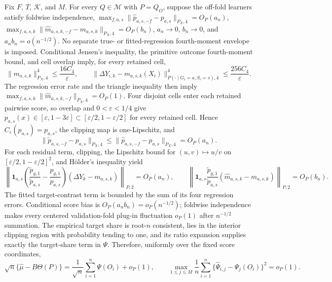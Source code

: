 Fix \(F\), \(T\), \(\mathcal K\), and \(M\). For every \(Q\in\mathcal M\) with \(P=Q_O\), suppose the off-fold learners satisfy foldwise independence, \(\max_{f,a,s}\|\widehat p_{a,s,-f}-p_{a,s}\|_{P_X,4}=O_P(a_n)\), \(\max_{f,a,s,k}\|\widehat m_{a,s,k,-f}-m_{a,s,k}\|_{P_X,4}=O_P(b_n)\), \(a_n\to0\), \(b_n\to0\), and \(a_nb_n=o(n^{-1/2})\). No separate true- or fitted-regression fourth-moment envelope is imposed. Conditional Jensen's inequality, the primitive outcome fourth-moment bound, and cell overlap imply, for every retained cell, \[\|m_{a,s,k}\|_{P_X,4}^4\le \frac{16C_4}{\varepsilon},\qquad \|\Delta Y_{i,k}-m_{a,s,k}(X_i)\|_{P(\cdot\mid G_i=a,S_i=s),4}^4\le\frac{256C_4}{\varepsilon}.\] The regression error rate and the triangle inequality then imply \(\max_{f,a,s,k}\|\widehat m_{a,s,k,-f}\|_{P_X,4}=O_P(1)\). Four disjoint cells enter each retained pairwise score, so overlap and \(0<\varepsilon<1/4\) give \(p_{a,s}(x)\in[\varepsilon,1-3\varepsilon]\subset[\varepsilon/2,1-\varepsilon/2]\) for every retained cell. Hence \(C_\varepsilon(p_{a,s})=p_{a,s}\), the clipping map is one-Lipschitz, and \[\|\widetilde p_{a,s,-f}-p_{a,s}\|_{P_X,4}\le\|\widehat p_{a,s,-f}-p_{a,s}\|_{P_X,4}=O_P(a_n).\] For each residual term, clipping, the Lipschitz bound for \((u,v)\mapsto u/v\) on \([\varepsilon/2,1-\varepsilon/2]^2\), and H\"older's inequality yield \[\left\|\mathbf 1_{a,s}\left(\frac{\widetilde p_{g,1}}{\widetilde p_{a,s}}-\frac{p_{g,1}}{p_{a,s}}\right)(\Delta Y_k-m_{a,s,k})\right\|_{P,2}=O_P(a_n),\qquad \left\|\mathbf 1_{a,s}\frac{\widetilde p_{g,1}}{\widetilde p_{a,s}}(\widehat m_{a,s,k}-m_{a,s,k})\right\|_{P,2}=O_P(b_n).\] The fitted target-contrast term is bounded by the sum of its four regression errors. Conditional score bias is \(O_P(a_nb_n)=o_P(n^{-1/2})\); foldwise independence makes every centered validation-fold plug-in fluctuation \(o_P(1)\) after \(n^{-1/2}\) summation. The empirical target share is root-\(n\) consistent, lies in the interior clipping region with probability tending to one, and its ratio expansion supplies exactly the target-share term in \(\Psi\). Therefore, uniformly over the fixed score coordinates, \[\sqrt n\{\widehat\mu-B\Theta(P)\}=\frac1{\sqrt n}\sum_{i=1}^n\Psi(O_i)+o_P(1),\qquad \max_{1\le j\le M}\frac1n\sum_{i=1}^n\{\widehat\Psi_{i,j}-\Psi_j(O_i)\}^2=o_P(1).\]
